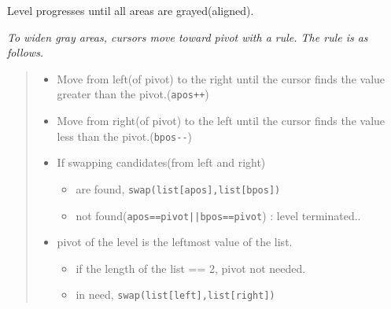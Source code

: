 \documentclass{article}
\begin{document}
\begin{center}
\end{center}




\begin{center}
\end{center}
Level progresses until all areas are grayed(aligned).
\begin{center}
    \textit{To widen gray areas, cursors move toward pivot with a rule. The rule is as follows.}
\end{center}


\begin{quote}\centering
\begin{itemize}
    \item[]Move from left(of pivot) to the right until the cursor finds the value greater than the pivot.(\verb|apos++|) 
    \item[]Move from right(of pivot) to the left until the cursor finds the value less than the pivot.(\verb|bpos--|) 
    \item[]If swapping candidates(from left and right)
    \begin{itemize}
        \item[]are found, \verb+swap(list[apos],list[bpos])+
        \item[]not found(\verb+apos==pivot||bpos==pivot+) : level terminated..
    \end{itemize}
    \item[]pivot of the level is the leftmost value of the list.
    \begin{itemize}
        \item[]if the length of the list == 2, pivot not needed.
        \item[]in need, \verb+swap(list[left],list[right])+
    \end{itemize}
\end{itemize}
\end{quote}
\end{document}
